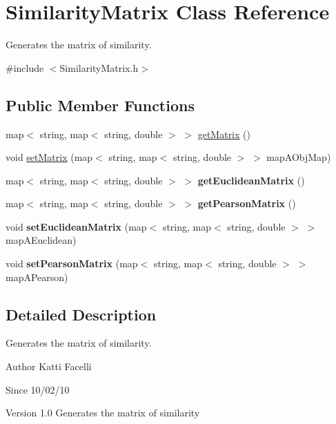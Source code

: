 \hypertarget{classSimilarityMatrix}{
\section{SimilarityMatrix Class Reference}
\label{classSimilarityMatrix}
}


Generates the matrix of similarity.  


{\ttfamily \#include $<$SimilarityMatrix.h$>$}\subsection*{Public Member Functions}
\begin{DoxyCompactItemize}
\item 
map$<$ string, map$<$ string, double $>$ $>$ \hyperlink{classSimilarityMatrix_ad23f50845db414b67e3b37e5717c5633}{getMatrix} ()
\item 
void \hyperlink{classSimilarityMatrix_a5ee88b8eebc7987f7b5fd7ce04100b9d}{setMatrix} (map$<$ string, map$<$ string, double $>$ $>$ mapAObjMap)
\item 
\hypertarget{classSimilarityMatrix_a26e3f69ce969d1b164f22333b678d4b2}{
map$<$ string, map$<$ string, double $>$ $>$ {\bfseries getEuclideanMatrix} ()}
\label{classSimilarityMatrix_a26e3f69ce969d1b164f22333b678d4b2}

\item 
\hypertarget{classSimilarityMatrix_adcb0ca4d12e0c0468305927fd6e87c2e}{
map$<$ string, map$<$ string, double $>$ $>$ {\bfseries getPearsonMatrix} ()}
\label{classSimilarityMatrix_adcb0ca4d12e0c0468305927fd6e87c2e}

\item 
\hypertarget{classSimilarityMatrix_a1e1dbb2aa9575458a75e266180535286}{
void {\bfseries setEuclideanMatrix} (map$<$ string, map$<$ string, double $>$ $>$ mapAEuclidean)}
\label{classSimilarityMatrix_a1e1dbb2aa9575458a75e266180535286}

\item 
\hypertarget{classSimilarityMatrix_a9c7c6e31dc49a069d469dbd53cc98476}{
void {\bfseries setPearsonMatrix} (map$<$ string, map$<$ string, double $>$ $>$ mapAPearson)}
\label{classSimilarityMatrix_a9c7c6e31dc49a069d469dbd53cc98476}

\end{DoxyCompactItemize}


\subsection{Detailed Description}
Generates the matrix of similarity. \begin{DoxyAuthor}{Author}
Katti Facelli 
\end{DoxyAuthor}
\begin{DoxySince}{Since}
10/02/10 
\end{DoxySince}
\begin{DoxyVersion}{Version}
1.0 Generates the matrix of similarity 
\end{DoxyVersion}


